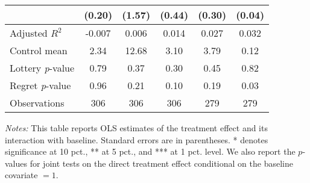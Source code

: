\begin{table}[htbp]
{\begin{threeparttable}
\begin{tabular}{l*{5}{c}}
                &   (0.20)         &   (1.57)         &   (0.44)         &   (0.30)         &   (0.04)         \\
\midrule
Adjusted \(R^{2}\)&   -0.007         &    0.006         &    0.014         &    0.027         &    0.032         \\
Control mean    &     2.34         &    12.68         &     3.10         &     3.79         &     0.12         \\
Lottery \emph{p}-value&     0.79         &     0.37         &     0.30         &     0.45         &     0.82         \\
Regret \emph{p}-value&     0.96         &     0.21         &     0.10         &     0.19         &     0.03         \\
Observations    &      306         &      306         &      306         &      279         &      279         \\
\bottomrule \end{tabular} \begin{tablenotes}[flushleft] \footnotesize \item \emph{Notes:} This table reports OLS estimates of the treatment effect and its interaction with baseline. Standard errors are in parentheses. * denotes significance at 10 pct., ** at 5 pct., and *** at 1 pct. level. We also report the \(p\)-values for joint tests on the direct treatment effect conditional on the baseline covariate $= 1$. \end{tablenotes} \end{threeparttable} } \end{table}

